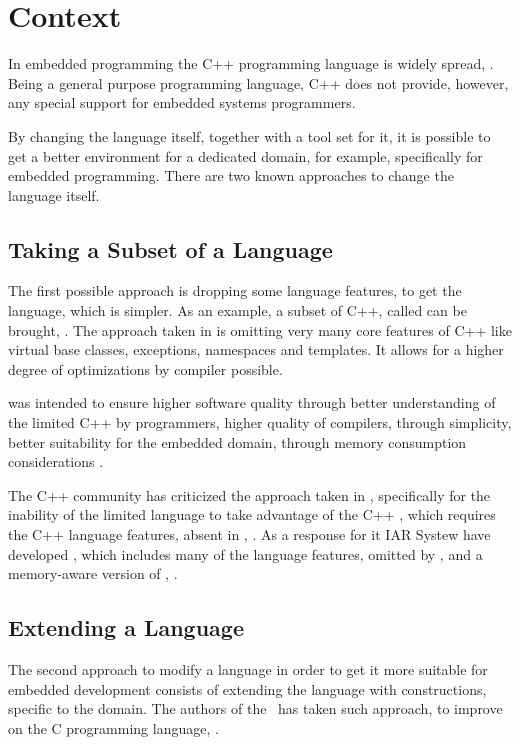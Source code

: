 
\section{Context}

In embedded programming the C++ programming language is widely spread, \cite{embedlangs}. Being a general purpose 
programming language, C++ does not provide, however, any special support for embedded systems programmers. 

By changing  the language itself, together with a tool set for it, it is possible to get a better environment 
for a dedicated domain, for example, specifically for embedded programming. There are two known approaches to change
the language itself.

\subsection{Taking a Subset of a Language}

The first possible approach is dropping some language features, to get the language, which is simpler. 
As an example, a subset of C++, called  can be brought, \cite{emcpp}. The approach taken in  is 
omitting very many core features of C++ like virtual base classes, exceptions, namespaces and templates. 
It allows for a higher degree of optimizations by compiler possible. 

 was intended to ensure higher software quality through better understanding of the limited 
C++ by programmers, higher quality of compilers, through simplicity, better suitability for the embedded domain, through
memory consumption considerations \cite{stripepp}. 

The C++ community has criticized the approach taken in , specifically for the inability of the 
limited language to take advantage of the C++ , which requires the C++ language features, absent in 
, \cite{stremcpp}. As a response for it IAR Systew have developed , which includes many of the language features,
omitted by , and a memory-aware version of , \cite{extendedembeddedcpp}.

\subsection{Extending a Language}

The second approach to modify a language in order to get it more suitable for embedded development consists of extending 
the language with constructions, specific to the domain. The authors of the \mbdp\ has taken such approach, to improve on
the C programming language, \cite{2012_voelter_mbeddr_extensible_c_based_language_and_ide_for_embedded}. 

